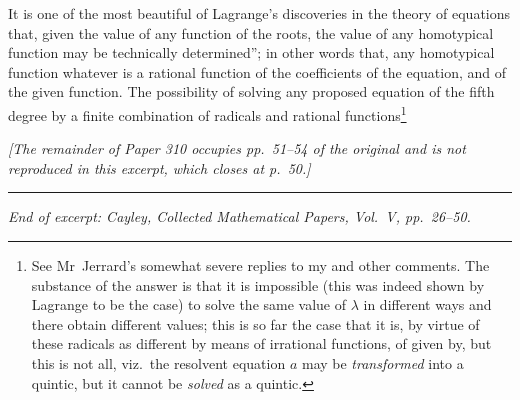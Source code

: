 \documentclass[11pt,a4paper]{article}
\begin{document}
\medskip

It is one of the most beautiful of Lagrange's discoveries in the theory of equations that, given the value of any function of the roots, the value of any homotypical function may be technically determined''; in other words that, any homotypical function whatever is a rational function of the coefficients of the equation, and of the given function. The possibility of solving any proposed equation of the fifth degree by a finite combination of radicals and rational functions\footnote{See Mr~Jerrard's somewhat severe replies to my and other comments. The substance of the answer is that it is impossible (this was indeed shown by Lagrange to be the case) to solve the same value of $\lambda$ in different ways and there obtain different values; this is so far the case that it is, by virtue of these radicals as different by means of irrational functions, of given by, but this is not all, viz.\ the resolvent equation $a$ may be \textit{transformed} into a quintic, but it cannot be \textit{solved} as a quintic.}

\bigskip

\noindent\textit{[The remainder of Paper 310 occupies pp.\ 51--54 of the original and is not reproduced in this excerpt, which closes at p.\ 50.]}

\bigskip

\noindent\rule{\textwidth}{0.4pt}
\vspace{1em}

\begin{center}
\textit{End of excerpt: Cayley, Collected Mathematical Papers, Vol.\ V, pp.\ 26--50.}
\end{center}
\end{document}
